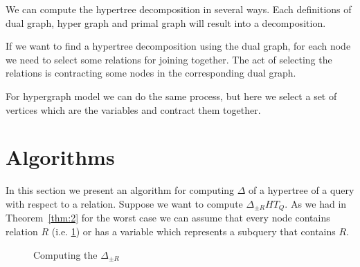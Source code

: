 \documentclass[12pt]{article}
\begin{document}
We can compute the hypertree decomposition in several ways. Each definitions of dual graph, hyper graph and primal graph will result into a decomposition.
\par
If we want to find a hypertree decomposition using the dual graph, for each node we need to select some relations for joining together. The act of selecting the relations is contracting some nodes in the corresponding dual graph. \\ \par
For hypergraph model we can do the same process, but here we select a set of vertices which are the variables and contract them together.
\section{Algorithms}
In this section we present an algorithm for computing  $\Delta$ of a hypertree of a query with respect to a relation.
Suppose we want to compute $\Delta_{\pm R}{HT_{Q}}$. As we had in Theorem~\ref{thm:2} for the worst case we can assume that every node contains relation $R$ (i.e. \ref{fig3}) or has a variable which represents a subquery that contains $R$.
\begin{figure}[htbp]
\begin{center}
\usetikzlibrary{fit}
\end{center}
\caption{Computing the $\Delta_{\pm R}$}
\label{fig3}
\end{figure}
\end{document}

